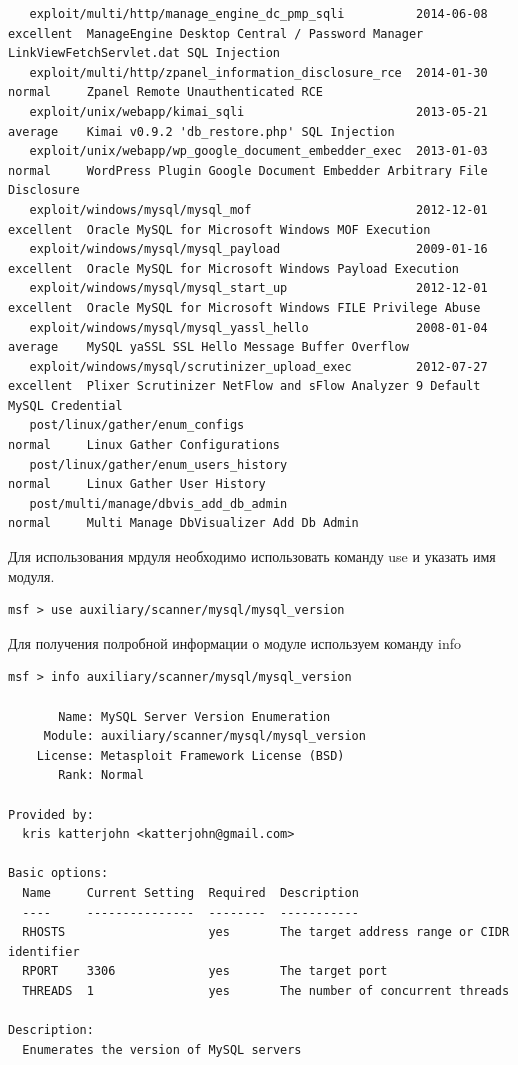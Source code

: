 \documentclass[10pt,a4paper]{report}
\begin{document}
\begin{verbatim}
   exploit/multi/http/manage_engine_dc_pmp_sqli          2014-06-08       excellent  ManageEngine Desktop Central / Password Manager LinkViewFetchServlet.dat SQL Injection
   exploit/multi/http/zpanel_information_disclosure_rce  2014-01-30       normal     Zpanel Remote Unauthenticated RCE
   exploit/unix/webapp/kimai_sqli                        2013-05-21       average    Kimai v0.9.2 'db_restore.php' SQL Injection
   exploit/unix/webapp/wp_google_document_embedder_exec  2013-01-03       normal     WordPress Plugin Google Document Embedder Arbitrary File Disclosure
   exploit/windows/mysql/mysql_mof                       2012-12-01       excellent  Oracle MySQL for Microsoft Windows MOF Execution
   exploit/windows/mysql/mysql_payload                   2009-01-16       excellent  Oracle MySQL for Microsoft Windows Payload Execution
   exploit/windows/mysql/mysql_start_up                  2012-12-01       excellent  Oracle MySQL for Microsoft Windows FILE Privilege Abuse
   exploit/windows/mysql/mysql_yassl_hello               2008-01-04       average    MySQL yaSSL SSL Hello Message Buffer Overflow
   exploit/windows/mysql/scrutinizer_upload_exec         2012-07-27       excellent  Plixer Scrutinizer NetFlow and sFlow Analyzer 9 Default MySQL Credential
   post/linux/gather/enum_configs                                         normal     Linux Gather Configurations
   post/linux/gather/enum_users_history                                   normal     Linux Gather User History
   post/multi/manage/dbvis_add_db_admin                                   normal     Multi Manage DbVisualizer Add Db Admin
\end{verbatim}
Для использования мрдуля необходимо использовать команду use и указать имя модуля.
\begin{verbatim}
msf > use auxiliary/scanner/mysql/mysql_version 
\end{verbatim}
Для получения полробной информации о модуле используем команду info
\begin{verbatim}
msf > info auxiliary/scanner/mysql/mysql_version

       Name: MySQL Server Version Enumeration
     Module: auxiliary/scanner/mysql/mysql_version
    License: Metasploit Framework License (BSD)
       Rank: Normal

Provided by:
  kris katterjohn <katterjohn@gmail.com>

Basic options:
  Name     Current Setting  Required  Description
  ----     ---------------  --------  -----------
  RHOSTS                    yes       The target address range or CIDR identifier
  RPORT    3306             yes       The target port
  THREADS  1                yes       The number of concurrent threads

Description:
  Enumerates the version of MySQL servers
\end{verbatim}
\end{document}
